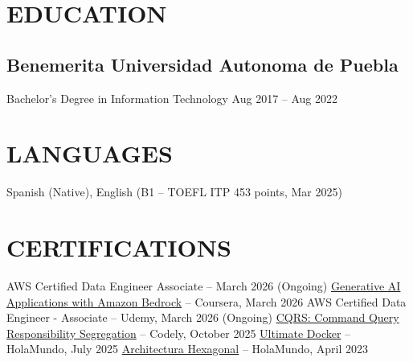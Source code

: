 \documentclass[a4paper,10pt]{article}
\begin{document}
\section*{EDUCATION}

\subsection*{\small Benemerita Universidad Autonoma de Puebla}
Bachelor's Degree in Information Technology \hfill Aug 2017 -- Aug 2022

\section*{LANGUAGES}
Spanish (Native), English (B1 -- TOEFL ITP 453 points, Mar 2025)

\section*{CERTIFICATIONS}
AWS Certified Data Engineer Associate -- March 2026 (Ongoing)
\href{https://coursera.org/verify/HEG7YFDO6D1C}{Generative AI Applications with Amazon Bedrock} -- Coursera, March 2026
AWS Certified Data Engineer - Associate -- Udemy, March 2026 (Ongoing)
\href{https://www.linkedin.com/in/jose-carlos-huerta-garcia-773952212/details/certifications}{CQRS: Command Query Responsibility Segregation} -- Codely, October 2025
\href{https://academia.holamundo.io/certificates/fifvbfywmp}{Ultimate Docker} -- HolaMundo, July 2025
\href{https://www.linkedin.com/in/jose-carlos-huerta-garcia-773952212/details/certifications/1758852008410/single-media-viewer/?profileId=ACoAADXjsscBqtjtdk4S_qpdkHwZs, Fn9y9TiG0o}{Architectura Hexagonal} -- HolaMundo, April 2023
\end{document}

